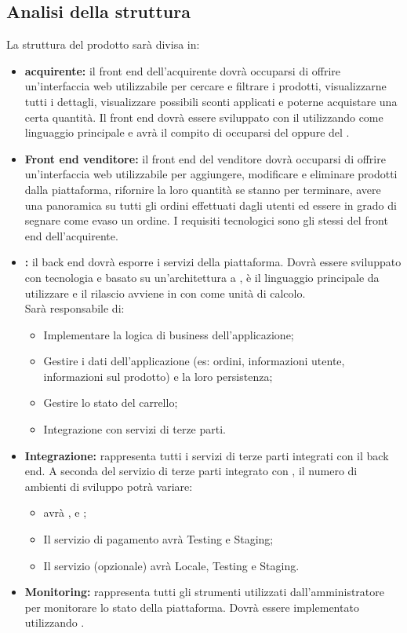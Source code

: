 \subsection{Analisi della struttura}
La struttura del prodotto sarà divisa in:
\begin{itemize}
    \item \textbf{ acquirente:} il front end dell'acquirente dovrà occuparsi di offrire un'interfaccia web utilizzabile per cercare e filtrare i prodotti, visualizzarne tutti i dettagli, visualizzare possibili sconti applicati e poterne acquistare una certa quantità. Il front end dovrà essere sviluppato con il   utilizzando come linguaggio principale  e avrà il compito di occuparsi del  oppure del .
    \item \textbf{Front end venditore:} il front end del venditore dovrà occuparsi di offrire un'interfaccia web utilizzabile per aggiungere, modificare e eliminare prodotti dalla piattaforma, rifornire la loro quantità se stanno per terminare, avere una panoramica su tutti gli ordini effettuati dagli utenti ed essere in grado di segnare come evaso un ordine. I requisiti tecnologici sono gli stessi del front end dell'acquirente.
    \item \textbf{:} il back end dovrà esporre i servizi della piattaforma. Dovrà essere sviluppato con tecnologia  e basato su un'architettura a ,  è il linguaggio principale da utilizzare e il rilascio avviene in  con  come unità di calcolo.\\
    Sarà responsabile di:
    \begin{itemize}
        \item Implementare la logica di business dell'applicazione;
        \item Gestire i dati dell'applicazione (es: ordini, informazioni utente, informazioni sul prodotto) e la loro persistenza;
        \item Gestire lo stato del carrello;
        \item Integrazione con servizi di terze parti.
    \end{itemize}
    \item \textbf{Integrazione:} rappresenta tutti i servizi di terze parti integrati con il back end. A seconda del servizio di terze parti integrato con \NomeProgetto{}, il numero di ambienti di sviluppo potrà variare:
    \begin{itemize}
        \item {} avrà ,  e ;
        \item Il servizio di pagamento avrà Testing e Staging;
        \item Il servizio  (opzionale) avrà Locale, Testing e Staging.
    \end{itemize}
    \item \textbf{Monitoring:} rappresenta tutti gli strumenti utilizzati dall'amministratore per monitorare lo stato della piattaforma. Dovrà essere implementato utilizzando .
\end{itemize}